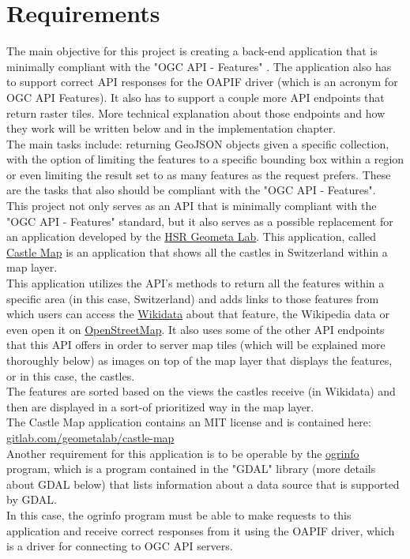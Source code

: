\section{Requirements}
The main objective for this project is creating a back-end application that is minimally compliant with the "OGC API - Features" \cite{OGCApiFeatures}. The application also has to support correct API responses for the OAPIF \cite{OAPIF} driver (which is an acronym for OGC API Features). It also has to support a couple more API endpoints that return raster tiles. More technical explanation about those endpoints and how they work will be written below and in the implementation chapter.\\
The main tasks include: returning GeoJSON objects given a specific collection, with the option of limiting the features to a specific bounding box within a region or even limiting the result set to as many features as the request prefers. These are the tasks that also should be compliant with the "OGC API - Features".\\
\newline
This project not only serves as an API that is minimally compliant with the "OGC API - Features" standard, but it also serves as a possible replacement for an application developed by the \href{https://www.hsr.ch/geometalab}{HSR Geometa Lab}. This application, called \href{https://castle-map.infs.ch/}{Castle Map} is an application that shows all the castles in Switzerland within a map layer.\\
This application utilizes the API's methods to return all the features within a specific area (in this case, Switzerland) and adds links to those features from which users can access the \href{https://www.wikidata.org/wiki/Wikidata:Main_Page}{Wikidata} about that feature, the Wikipedia data or even open it on \href{https://www.openstreetmap.org/node/1500554009}{OpenStreetMap}. It also uses some of the other API endpoints that this API offers in order to server map tiles (which will be explained more thoroughly below) as images on top of the map layer that displays the features, or in this case, the castles.\\
The features are sorted based on the views the castles receive (in Wikidata) and then are displayed in a sort-of prioritized way in the map layer.\\
The Castle Map application contains an MIT license and is contained here:\\ \href{https://gitlab.com/geometalab/castle-map}{gitlab.com/geometalab/castle-map}\\
\newline
Another requirement for this application is to be operable by the \href{https://gdal.org/programs/ogrinfo.html}{ogrinfo} program, which is a program contained in the "GDAL" library (more details about GDAL below) that lists information about a data source that is supported by GDAL.\\
In this case, the ogrinfo program must be able to make requests to this application and receive correct responses from it using the OAPIF driver, which is a driver for connecting to OGC API servers. 
\newpage


